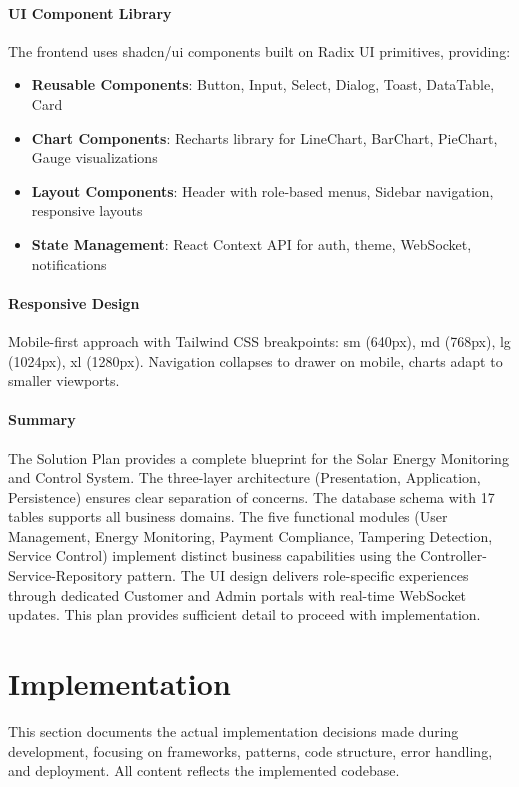 \paragraph{UI Component Library}
The frontend uses shadcn/ui components built on Radix UI primitives, providing:
\begin{itemize}
    \item \textbf{Reusable Components}: Button, Input, Select, Dialog, Toast, DataTable, Card
    \item \textbf{Chart Components}: Recharts library for LineChart, BarChart, PieChart, Gauge visualizations
    \item \textbf{Layout Components}: Header with role-based menus, Sidebar navigation, responsive layouts
    \item \textbf{State Management}: React Context API for auth, theme, WebSocket, notifications
\end{itemize}

\paragraph{Responsive Design}
Mobile-first approach with Tailwind CSS breakpoints: sm (640px), md (768px), lg (1024px), xl (1280px). Navigation collapses to drawer on mobile, charts adapt to smaller viewports.

\paragraph{Summary}
The Solution Plan provides a complete blueprint for the Solar Energy Monitoring and Control System. The three-layer architecture (Presentation, Application, Persistence) ensures clear separation of concerns. The database schema with 17 tables supports all business domains. The five functional modules (User Management, Energy Monitoring, Payment Compliance, Tampering Detection, Service Control) implement distinct business capabilities using the Controller-Service-Repository pattern. The UI design delivers role-specific experiences through dedicated Customer and Admin portals with real-time WebSocket updates. This plan provides sufficient detail to proceed with implementation.

\section{Implementation}
\label{sec:implementation}

This section documents the actual implementation decisions made during development, focusing on frameworks, patterns, code structure, error handling, and deployment. All content reflects the implemented codebase.

